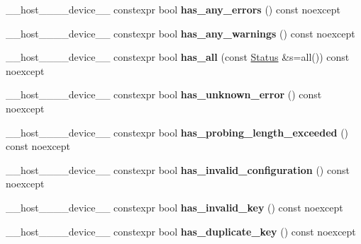 \begin{DoxyCompactItemize}
\+\_\+\+\_\+host\+\_\+\+\_\+\+\_\+\+\_\+device\+\_\+\+\_\+ constexpr bool {\bfseries has\+\_\+any\+\_\+errors} () const noexcept
\item 
\mbox{\label{classwarpcore_1_1Status_acd0897a896bf66101c1fffc931c31780}} 
\+\_\+\+\_\+host\+\_\+\+\_\+\+\_\+\+\_\+device\+\_\+\+\_\+ constexpr bool {\bfseries has\+\_\+any\+\_\+warnings} () const noexcept
\item 
\mbox{\label{classwarpcore_1_1Status_a0e5badc89fc3fa0cdde54136aba62bc1}} 
\+\_\+\+\_\+host\+\_\+\+\_\+\+\_\+\+\_\+device\+\_\+\+\_\+ constexpr bool {\bfseries has\+\_\+all} (const \hyperlink{classwarpcore_1_1Status}{Status} \&s=all()) const noexcept
\item 
\mbox{\label{classwarpcore_1_1Status_afe2744717c4c602d64012c2e928a13fc}} 
\+\_\+\+\_\+host\+\_\+\+\_\+\+\_\+\+\_\+device\+\_\+\+\_\+ constexpr bool {\bfseries has\+\_\+unknown\+\_\+error} () const noexcept
\item 
\mbox{\label{classwarpcore_1_1Status_aa66c0dfa15c46db54ef313c813c8aef9}} 
\+\_\+\+\_\+host\+\_\+\+\_\+\+\_\+\+\_\+device\+\_\+\+\_\+ constexpr bool {\bfseries has\+\_\+probing\+\_\+length\+\_\+exceeded} () const noexcept
\item 
\mbox{\label{classwarpcore_1_1Status_a2e898bf185d65a1be3ed10e43b1d15eb}} 
\+\_\+\+\_\+host\+\_\+\+\_\+\+\_\+\+\_\+device\+\_\+\+\_\+ constexpr bool {\bfseries has\+\_\+invalid\+\_\+configuration} () const noexcept
\item 
\mbox{\label{classwarpcore_1_1Status_aec4300eb32bc3cad4a6e6a97c311dfcf}} 
\+\_\+\+\_\+host\+\_\+\+\_\+\+\_\+\+\_\+device\+\_\+\+\_\+ constexpr bool {\bfseries has\+\_\+invalid\+\_\+key} () const noexcept
\item 
\mbox{\label{classwarpcore_1_1Status_ae2d878f3cf60c3250d783be8bc31f69f}} 
\+\_\+\+\_\+host\+\_\+\+\_\+\+\_\+\+\_\+device\+\_\+\+\_\+ constexpr bool {\bfseries has\+\_\+duplicate\+\_\+key} () const noexcept
\item 
\mbox{\label{classwarpcore_1_1Status_a6dcfcc7d2c6fddb694aa0358ad65cd1b}} 

\end{DoxyCompactItemize}
